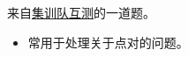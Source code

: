 \noindent 来自\href{https://www.luogu.com.cn/problem/P2634}{集训队互测}的一道题。

\begin{itemize}
    \item 常用于处理关于点对的问题。
\end{itemize}